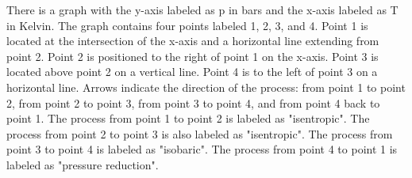 There is a graph with the y-axis labeled as p in bars and the x-axis labeled as T in Kelvin. The graph contains four points labeled 1, 2, 3, and 4. Point 1 is located at the intersection of the x-axis and a horizontal line extending from point 2. Point 2 is positioned to the right of point 1 on the x-axis. Point 3 is located above point 2 on a vertical line. Point 4 is to the left of point 3 on a horizontal line. Arrows indicate the direction of the process: from point 1 to point 2, from point 2 to point 3, from point 3 to point 4, and from point 4 back to point 1. The process from point 1 to point 2 is labeled as "isentropic". The process from point 2 to point 3 is also labeled as "isentropic". The process from point 3 to point 4 is labeled as "isobaric". The process from point 4 to point 1 is labeled as "pressure reduction".